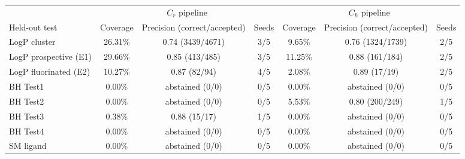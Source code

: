 \begin{tabular}{@{}lcccccc@{}}
\toprule
 & \multicolumn{3}{c}{$C_r$ pipeline} & \multicolumn{3}{c}{$C_h$ pipeline} \\
\cmidrule(lr){2-4}\cmidrule(lr){5-7}
Held-out test & Coverage & Precision (correct/accepted) & Seeds & Coverage & Precision (correct/accepted) & Seeds \\
\midrule
LogP cluster & 26.31\% & 0.74 (3439/4671) & 3/5 & 9.65\% & 0.76 (1324/1739) & 2/5 \\
LogP prospective (E1) & 29.66\% & 0.85 (413/485) & 3/5 & 11.25\% & 0.88 (161/184) & 2/5 \\
LogP fluorinated (E2) & 10.27\% & 0.87 (82/94) & 4/5 & 2.08\% & 0.89 (17/19) & 2/5 \\
BH Test1 & 0.00\% & abstained (0/0) & 0/5 & 0.00\% & abstained (0/0) & 0/5 \\
BH Test2 & 0.00\% & abstained (0/0) & 0/5 & 5.53\% & 0.80 (200/249) & 1/5 \\
BH Test3 & 0.38\% & 0.88 (15/17) & 1/5 & 0.00\% & abstained (0/0) & 0/5 \\
BH Test4 & 0.00\% & abstained (0/0) & 0/5 & 0.00\% & abstained (0/0) & 0/5 \\
SM ligand & 0.00\% & abstained (0/0) & 0/5 & 0.00\% & abstained (0/0) & 0/5 \\
\bottomrule
\end{tabular}